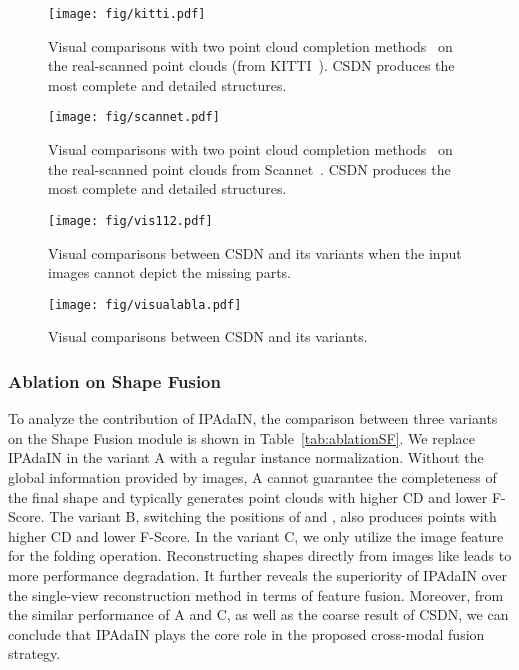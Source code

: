 \begin{figure}[h]
  \centering
  \texttt{[image: fig/kitti.pdf]}
  \caption{Visual comparisons with two point cloud completion methods~\cite{zhang2021view,yu2021pointr} on the real-scanned point clouds (from KITTI~\cite{geiger2013vision}). CSDN produces the most complete and detailed structures.}
  \label{fig:kitti}
\end{figure}  
\begin{figure}[ht]
  \centering
  \texttt{[image: fig/scannet.pdf]}
  \caption{Visual comparisons with two point cloud completion methods~\cite{zhang2021view,yu2021pointr} on the real-scanned point clouds from Scannet~\cite{dai2017scannet}. CSDN produces the most complete and detailed structures.}
  \label{fig:scannet}
\end{figure} 
\begin{figure*}[ht] 
  \centering
  \texttt{[image: fig/vis112.pdf]}
  \caption{Visual comparisons between CSDN and its variants when the input images cannot depict the missing parts.}
  \label{fig:vis112}
\end{figure*}
\begin{figure*}[ht] 
  \centering
  \texttt{[image: fig/visualabla.pdf]}
  \caption{Visual comparisons between CSDN and its variants.}
  \label{fig:visualabla}
\end{figure*}

\subsubsection{Ablation on Shape Fusion}
To analyze the contribution of IPAdaIN, the comparison between three variants on the Shape Fusion module is shown in Table~\ref{tab:ablationSF}. We replace IPAdaIN in the variant A with a regular instance normalization. Without the global information provided by images, A cannot guarantee the completeness of the final shape and typically generates point clouds with higher CD and lower F-Score. The variant B, switching the positions of \emph{} and \emph{}, also produces points with higher CD and lower F-Score. In the variant C, we only utilize the image feature for the folding operation. Reconstructing shapes directly from images like \cite{zhang2021view} leads to more performance degradation. It further reveals the superiority of IPAdaIN over the single-view reconstruction method in terms of feature fusion. Moreover, from the similar performance of A and C, as well as the coarse result of CSDN, we can conclude that IPAdaIN plays the core role in the proposed cross-modal fusion strategy.

